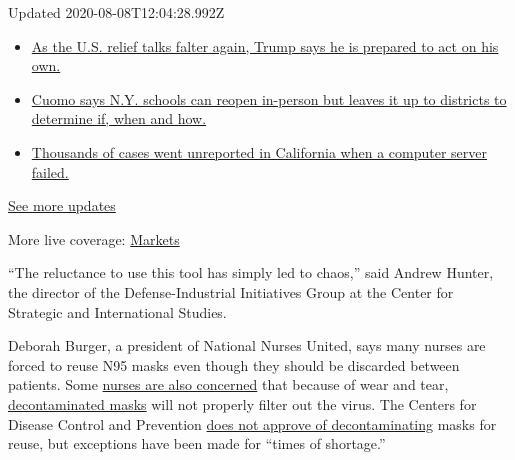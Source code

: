 Updated 2020-08-08T12:04:28.992Z

\begin{itemize}
\tightlist
\item
  \href{https://www.nytimes.com/2020/08/07/world/covid-19-news.html?action=click\&pgtype=Article\&state=default\&region=MAIN_CONTENT_1\&context=storylines_live_updates\#link-1f86d03a}{As
  the U.S. relief talks falter again, Trump says he is prepared to act
  on his own.}
\item
  \href{https://www.nytimes.com/2020/08/07/world/covid-19-news.html?action=click\&pgtype=Article\&state=default\&region=MAIN_CONTENT_1\&context=storylines_live_updates\#link-3f64a70a}{Cuomo
  says N.Y. schools can reopen in-person but leaves it up to districts
  to determine if, when and how.}
\item
  \href{https://www.nytimes.com/2020/08/07/world/covid-19-news.html?action=click\&pgtype=Article\&state=default\&region=MAIN_CONTENT_1\&context=storylines_live_updates\#link-14e70066}{Thousands
  of cases went unreported in California when a computer server failed.}
\end{itemize}

\href{https://www.nytimes.com/2020/08/07/world/covid-19-news.html?action=click\&pgtype=Article\&state=default\&region=MAIN_CONTENT_1\&context=storylines_live_updates}{See
more updates}

More live coverage:
\href{https://www.nytimes.com/live/2020/08/07/business/stock-market-today-coronavirus?action=click\&pgtype=Article\&state=default\&region=MAIN_CONTENT_1\&context=storylines_live_updates}{Markets}

``The reluctance to use this tool has simply led to chaos,'' said Andrew
Hunter, the director of the Defense-Industrial Initiatives Group at the
Center for Strategic and International Studies.

Deborah Burger, a president of National Nurses United, says many nurses
are forced to reuse N95 masks even though they should be discarded
between patients. Some
\href{https://www.nytimes.com/2020/07/08/health/coronavirus-masks-ppe-doc.html}{nurses
are also concerned} that because of wear and tear,
\href{https://www.nytimes.com/2020/04/11/business/coronavirus-n95-mask-decontaminating-reuse.html}{decontaminated
masks} will not properly filter out the virus. The Centers for Disease
Control and Prevention
\href{https://www.cdc.gov/coronavirus/2019-ncov/hcp/ppe-strategy/decontamination-reuse-respirators.html}{does
not approve of decontaminating} masks for reuse, but exceptions have
been made for ``times of shortage.''

